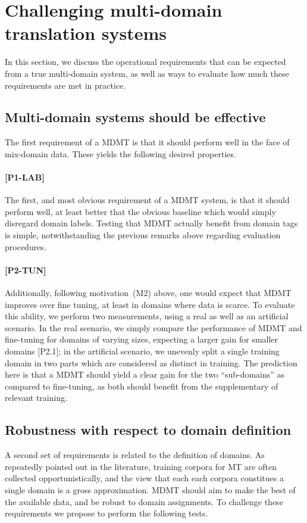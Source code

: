 \documentclass[11pt]{article}
\newcommand{\fyTodo}[1]{\Todo[FY:]{\textcolor{orange}{#1}}}
\begin{document}
\section{Challenging multi-domain translation systems}
In this section, we discuss the operational requirements that can be expected from a true multi-domain system, as well as ways to evaluate how much these requirements are met in practice.

\subsection{Multi-domain systems should be effective \label{ssec:effective}}
The first requirement of a MDMT is that it should perform well in the face of mix-domain data. These yields the following desired properties.

\paragraph{[P1-LAB]}\fyTodo{Decide naming scheme} The first, and most obvious requirement of a MDMT system, is that it should perform well, at least better that the obvious baseline which would simply disregard domain labels. Testing that MDMT actually benefit from domain tags is simple, notwithstanding the previous remarks above regarding evaluation procedures.

\paragraph{[P2-TUN]} Additionally, following motivation~(M2) above, one would expect that MDMT improves over fine tuning, at least in domains where data is scarce. To evaluate this ability, we perform two measurements, using a real as well as an artificial scenario. In the real scenario, we simply compare the performance of MDMT and fine-tuning for domains of varying sizes, expecting a larger gain for smaller domains [P2.1]; in the artificial scenario, we unevenly split a single training domain in two parts which are considered as distinct in training. The prediction here is that a MDMT should yield a clear gain for the two ``sub-domains'' as compared to fine-tuning, as both should benefit from the supplementary of relevant training.

\subsection{Robustness with respect to domain definition \label{ssec:robusness}}
A second set of requirements is related to the definition of domains. As repeatedly pointed out in the literature, training corpora for MT are often collected opportunistically, and the view that each each corpora constitues a single domain is a gross approximation. MDMT should aim to make the best of the available data, and be robust to domain assignments. To challenge these requirements we propose to perform the following tests. 
\end{document}
